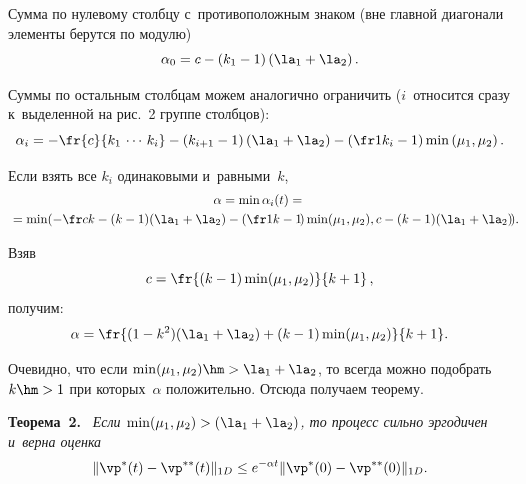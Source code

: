 \begin{figure}
\vspace*{-518pt}  %

\hspace{328pt}\hbox{}\hspace*{-13pt} %
      \end{figure}




Сумма по нулевому столбцу с~противоположным знаком (вне 
главной диагонали элементы берутся по модулю)
\begin{equation*}
\alpha_0=c - (k_1-1)\left(\la_1+\la_2\right).
\end{equation*}

Суммы по остальным  столбцам можем  аналогично ограничить 
($i$~относится сразу к~выделенной на рис.~2 группе столбцов):
\begin{equation*}
\alpha_i=-\fr {c}{k_1\,\cdots\,k_i} - \left(k_{i+1}-1\right)\left(\la_1+\la_2\right)-
 \left(\fr 1{k_i}-1\right)\min\left(\mu_1,\mu_2\right).
\end{equation*}


Если взять все $k_i$ одинаковыми и~равными~$k$,
\begin{multline*}
\alpha=\min \alpha_i(t)={}\\
{}=\min \! \left(-\fr c{k} - (k-1)(\la_1+\la_2)- \left(\fr 1{k}-1\!\right)\min(\mu_1,\mu_2),
c - (k-1)(\la_1+\la_2)\! \right)\!.\hspace*{-7.11815pt}
\end{multline*}


Взяв  
$$
c=\fr{(k-1)\min(\mu_1,\mu_2)}{k+1}\,,
$$
 получим:
\begin{equation}
\alpha=\fr{(1-k^2)(\la_1+\la_2)+(k-1)\min(\mu_1,\mu_2)}{k+1}.
\label{eqtmp2}
\end{equation}

Очевидно, что если $\min(\mu_1,\mu_2)\hm>\la_1+\la_2$, то 
всегда можно подобрать $k\hm>1$ при которых~$\alpha$ положительно.
%
Отсюда получаем теорему.

\smallskip

\noindent
\textbf{Теорема~2.}\
\textit{Если $\min(\mu_1,\mu_2)>(\la_1+\la_2)$, то процесс сильно эргодичен и~верна оценка}
\begin{equation}
\|\vp^*(t)-\vp^{**}(t)\|_{1D}\le e^{-\alpha t} \|\vp^*(0)-\vp^{**}(0)\|_{1D}.
\label{weakergbound1}
\end{equation}



